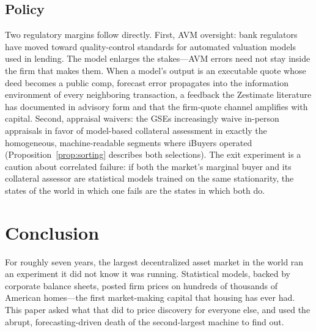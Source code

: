 \documentclass[12pt, letterpaper]{article}
\theoremstyle{remark}
\begin{document}
\subsection{Policy}\label{sec:interp-policy}

Two regulatory margins follow directly. First, AVM oversight: bank regulators have moved toward quality-control standards for automated valuation models used in lending. The model enlarges the stakes---AVM errors need not stay inside the firm that makes them. When a model's output is an executable quote whose deed becomes a public comp, forecast error propagates into the information environment of every neighboring transaction, a feedback the Zestimate literature has documented in advisory form \citep{fu2022feedback} and that the firm-quote channel amplifies with capital. Second, appraisal waivers: the GSEs increasingly waive in-person appraisals in favor of model-based collateral assessment in exactly the homogeneous, machine-readable segments where iBuyers operated (Proposition~\ref{prop:sorting} describes both selections). The exit experiment is a caution about correlated failure: if both the market's marginal buyer and its collateral assessor are statistical models trained on the same stationarity, the states of the world in which one fails are the states in which both do.

\section{Conclusion}\label{sec:conclusion}

For roughly seven years, the largest decentralized asset market in the world ran an experiment it did not know it was running. Statistical models, backed by corporate balance sheets, posted firm prices on hundreds of thousands of American homes---the first market-making capital that housing has ever had. This paper asked what that did to price discovery for everyone else, and used the abrupt, forecasting-driven death of the second-largest machine to find out.
\end{document}

